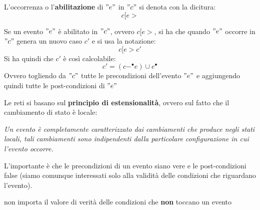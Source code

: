 \begin{nota}
  
  L'occorrenza o l'\textbf{abilitazione} di $"e"$ in $"c"$ si denota con la dicitura:
  \[c[e >\]
  \end{nota}
\begin{definizione}
  Se un evento $"e"$ è abilitato in $"c"$, ovvero $c[e >$, si ha che quando $"e"$
  occorre in $"c"$ genera un nuovo caso $c'$ e si usa la notazione:
  \[c[e > c'\]
  Si ha quindi che $c'$ è così calcolabile:
  \[c'=(c-^\bullet e)\cup e^\bullet\]
  Ovvero togliendo da $"c"$ tutte le precondizioni dell'evento $"e"$ e aggiungendo
  quindi tutte le post-condizioni di $"e"$
\end{definizione} \vspace{5mm} %
\begin{definizione}
  Le reti si basano sul \textbf{principio di estensionalità}, ovvero sul fatto che
il cambiamento di stato è locale:
\begin{center}
  \textit{Un evento è completamente caratterizzato dai cambiamenti che produce
    negli stati locali, tali cambiamenti sono indipendenti dalla particolare
    configurazione in cui l’evento occorre.}
\end{center}
\end{definizione} \vspace{5mm} %
L'importante è che le precondizioni di un evento siano vere e le post-condizioni
false (siamo comunque interessati solo alla validità delle condizioni che
riguardano l'evento).
\begin{nota}
non importa il valore di verità delle condizioni che \textbf{non} toccano un evento
\end{nota}
